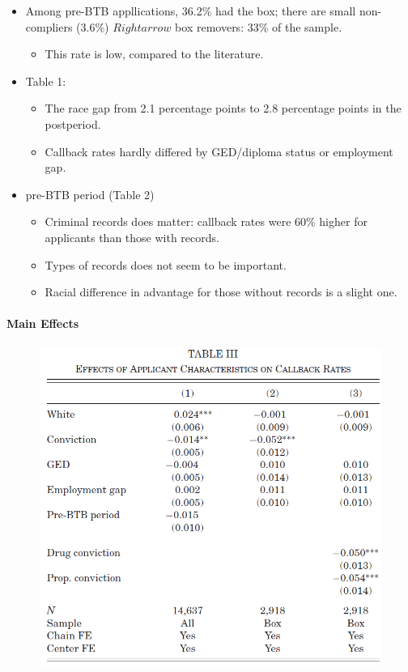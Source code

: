 \documentclass[../root]{subfiles}
\begin{document}
    \begin{itemize}
      \item Among pre-BTB appllications, 36.2\% had the box; there are small non-compliers (3.6\%) $Rightarrow$ box removers: 33\% of the sample.
      \begin{itemize}
        \item This rate is low, compared to the literature.
      \end{itemize}
      \item Table 1:
      \begin{itemize}
        \item The race gap from 2.1 percentage points to 2.8 percentage points in the postperiod.
        \item Callback rates hardly differed by GED/diploma status or employment gap.
      \end{itemize}
      \item pre-BTB period (Table 2)
      \begin{itemize}
        \item Criminal records does matter: callback rates were 60\% higher for applicants than those with records.
        \item Types of records does not seem to be important.
        \item Racial difference in advantage for those without records is a slight one.
      \end{itemize}
    \end{itemize}

    \paragraph{Main Effects}

    \begin{figure}[ht]
        \centering
        \includegraphics[scale = .6]{0925tanji/T3}
    \end{figure}
\end{document}
